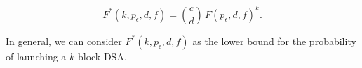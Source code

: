 \documentclass{article}
\begin{document}
\begin{equation}
    F^*(k,p_\epsilon,d,f) = \binom{c}{d}\,F(p_\epsilon,d,f)^k.
\end{equation}

In general, we can consider $F^*(k,p_\epsilon,d,f)$ as the lower bound for the probability of launching a $k$-block DSA.

  

\end{document}
